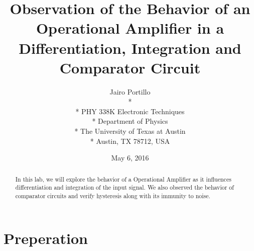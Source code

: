 \documentclass[11pt,letterpaper,onecolumn]{article}
\begin{document}

\title{\bf Observation of the Behavior of an Operational Amplifier in a Differentiation, Integration and Comparator Circuit}

\author{
 Jairo Portillo \\*
  \\*
 PHY 338K Electronic Techniques \\*
 Department of Physics \\*
 The University of Texas at Austin \\*
 Austin, TX 78712, USA
}
\date{May 6, 2016}


\maketitle


\begin{abstract}

In this lab, we will explore the behavior of a Operational Amplifier as it influences differentiation and integration of the input signal. We also observed the behavior of comparator circuits and verify hysteresis along with its immunity to noise.

\end{abstract}



\section{Preperation}
\end{document}

